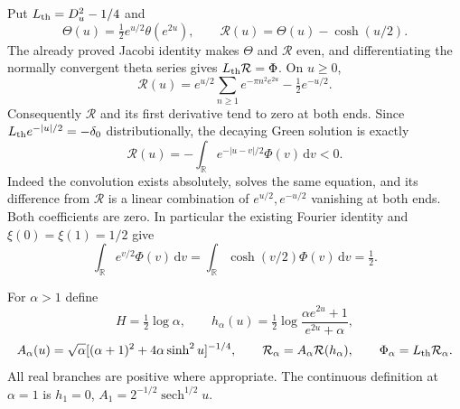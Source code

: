 \documentclass[11pt]{article}
\theoremstyle{remark}\newtheorem{remark}[theorem]{Remark}
\newcommand{\R}{\mathbb R}
\newcommand{\dd}{\,\mathrm d}
\begin{document}
Put $L_{\rm th}=D_u^2-1/4$ and
\[
 \Theta(u)=\tfrac12e^{u/2}\theta(e^{2u}),\qquad
 \mathcal R(u)=\Theta(u)-\cosh(u/2).
\]
The already proved Jacobi identity makes $\Theta$ and $\mathcal R$ even,
and differentiating the normally convergent theta series gives
$L_{\rm th}\mathcal R=\Phi$. On $u\ge0$,
\[
 \mathcal R(u)=e^{u/2}\sum_{n\ge1}e^{-\pi n^2e^{2u}}
                                      -\tfrac12e^{-u/2}.
\]
Consequently $\mathcal R$ and its first derivative tend to zero at both
ends. Since $L_{\rm th}e^{-|u|/2}=-\delta_0$ distributionally, the
decaying Green solution is exactly
\[
 \mathcal R(u)=-\int_\R e^{-|u-v|/2}\Phi(v)\dd v<0. \tag{MG}
\]
Indeed the convolution exists absolutely, solves the same equation, and
its difference from $\mathcal R$ is a linear combination of
$e^{u/2},e^{-u/2}$ vanishing at both ends. Both coefficients are zero.
In particular the existing Fourier identity and
$\xi(0)=\xi(1)=1/2$ give
\[
 \int_\R e^{v/2}\Phi(v)\dd v
 =\int_\R\cosh(v/2)\Phi(v)\dd v=\tfrac12.
\]

For $\alpha>1$ define
\[
 H=\tfrac12\log\alpha,\qquad
 h_\alpha(u)=\tfrac12\log\frac{\alpha e^{2u}+1}{e^{2u}+\alpha},
\]
\[
 A_\alpha(u)=\sqrt\alpha
       [ (\alpha+1)^2+4\alpha\sinh^2u]^{-1/4},\qquad
 \mathcal R_\alpha=A_\alpha\mathcal R(h_\alpha),\qquad
 \Phi_\alpha=L_{\rm th}\mathcal R_\alpha.
\]
All real branches are positive where appropriate. The continuous
definition at $\alpha=1$ is
$h_1=0$, $A_1=2^{-1/2}\operatorname{sech}^{1/2}u$.
\end{document}
